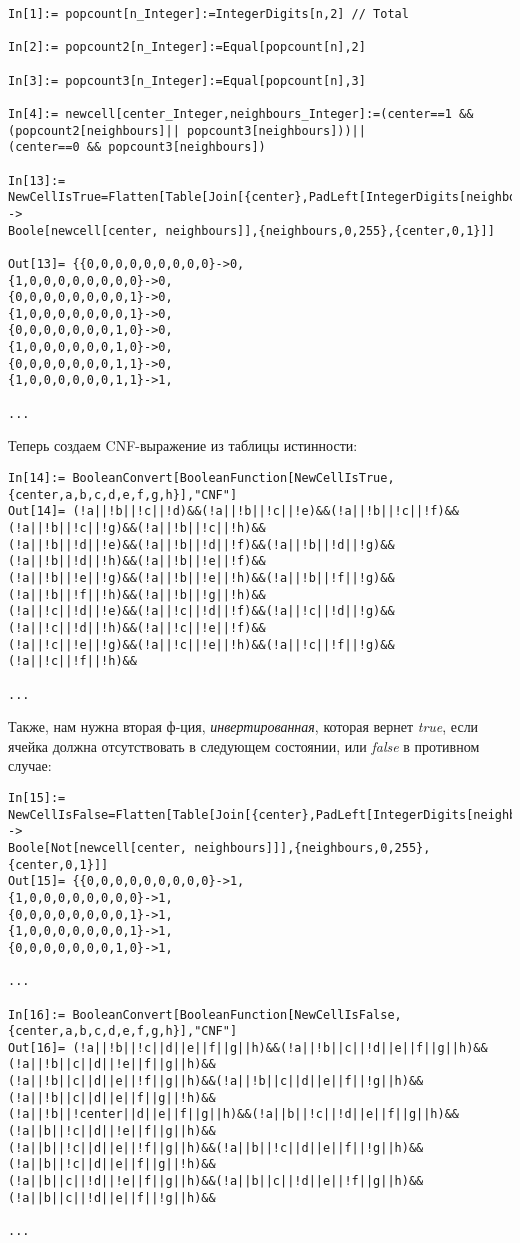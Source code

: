 \begin{lstlisting}
In[1]:= popcount[n_Integer]:=IntegerDigits[n,2] // Total

In[2]:= popcount2[n_Integer]:=Equal[popcount[n],2]

In[3]:= popcount3[n_Integer]:=Equal[popcount[n],3]

In[4]:= newcell[center_Integer,neighbours_Integer]:=(center==1 && (popcount2[neighbours]|| popcount3[neighbours]))||
(center==0 && popcount3[neighbours])

In[13]:= NewCellIsTrue=Flatten[Table[Join[{center},PadLeft[IntegerDigits[neighbours,2],8]] ->
Boole[newcell[center, neighbours]],{neighbours,0,255},{center,0,1}]]

Out[13]= {{0,0,0,0,0,0,0,0,0}->0,
{1,0,0,0,0,0,0,0,0}->0,
{0,0,0,0,0,0,0,0,1}->0,
{1,0,0,0,0,0,0,0,1}->0,
{0,0,0,0,0,0,0,1,0}->0,
{1,0,0,0,0,0,0,1,0}->0,
{0,0,0,0,0,0,0,1,1}->0,
{1,0,0,0,0,0,0,1,1}->1,

...

\end{lstlisting}

Теперь создаем \ac{CNF}-выражение из таблицы истинности:

\begin{lstlisting}
In[14]:= BooleanConvert[BooleanFunction[NewCellIsTrue,{center,a,b,c,d,e,f,g,h}],"CNF"]
Out[14]= (!a||!b||!c||!d)&&(!a||!b||!c||!e)&&(!a||!b||!c||!f)&&(!a||!b||!c||!g)&&(!a||!b||!c||!h)&&
(!a||!b||!d||!e)&&(!a||!b||!d||!f)&&(!a||!b||!d||!g)&&(!a||!b||!d||!h)&&(!a||!b||!e||!f)&&
(!a||!b||!e||!g)&&(!a||!b||!e||!h)&&(!a||!b||!f||!g)&&(!a||!b||!f||!h)&&(!a||!b||!g||!h)&&
(!a||!c||!d||!e)&&(!a||!c||!d||!f)&&(!a||!c||!d||!g)&&(!a||!c||!d||!h)&&(!a||!c||!e||!f)&&
(!a||!c||!e||!g)&&(!a||!c||!e||!h)&&(!a||!c||!f||!g)&&(!a||!c||!f||!h)&&

...

\end{lstlisting}

Также, нам нужна вторая ф-ция, \textit{инвертированная}, которая вернет \textit{true},
если ячейка должна отсутствовать в следующем состоянии, или \textit{false} в противном случае:

\begin{lstlisting}
In[15]:= NewCellIsFalse=Flatten[Table[Join[{center},PadLeft[IntegerDigits[neighbours,2],8]] ->
Boole[Not[newcell[center, neighbours]]],{neighbours,0,255},{center,0,1}]]
Out[15]= {{0,0,0,0,0,0,0,0,0}->1,
{1,0,0,0,0,0,0,0,0}->1,
{0,0,0,0,0,0,0,0,1}->1,
{1,0,0,0,0,0,0,0,1}->1,
{0,0,0,0,0,0,0,1,0}->1,

...

In[16]:= BooleanConvert[BooleanFunction[NewCellIsFalse,{center,a,b,c,d,e,f,g,h}],"CNF"]
Out[16]= (!a||!b||!c||d||e||f||g||h)&&(!a||!b||c||!d||e||f||g||h)&&(!a||!b||c||d||!e||f||g||h)&&
(!a||!b||c||d||e||!f||g||h)&&(!a||!b||c||d||e||f||!g||h)&&(!a||!b||c||d||e||f||g||!h)&&
(!a||!b||!center||d||e||f||g||h)&&(!a||b||!c||!d||e||f||g||h)&&(!a||b||!c||d||!e||f||g||h)&&
(!a||b||!c||d||e||!f||g||h)&&(!a||b||!c||d||e||f||!g||h)&&(!a||b||!c||d||e||f||g||!h)&&
(!a||b||c||!d||!e||f||g||h)&&(!a||b||c||!d||e||!f||g||h)&&(!a||b||c||!d||e||f||!g||h)&&

...

\end{lstlisting}


